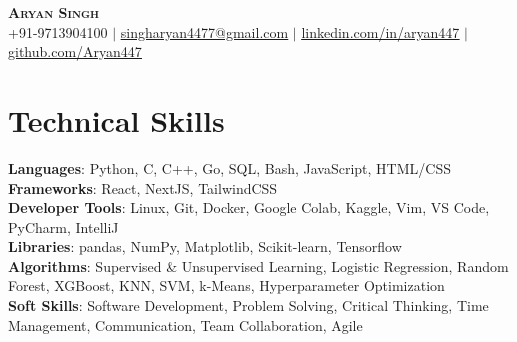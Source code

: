 \documentclass[letterpaper,11pt]{article}
\begin{document}

\begin{center}
    \textbf{\Huge \scshape Aryan Singh} \\ \vspace{1pt}
    \small +91-9713904100 $|$ \href{singharyan4477@gmail.com}{\underline{singharyan4477@gmail.com}} $|$
    \href{https://linkedin.com/in/aryan447/}{\underline{linkedin.com/in/aryan447}} $|$
    \href{https://github.com/Aryan447}{\underline{github.com/Aryan447}}
\end{center}

\section{Technical Skills}
 \begin{itemize}[leftmargin=0.15in, label={}]
    \small{\item{
     \textbf{Languages}{: Python, C, C++, Go, SQL, Bash, JavaScript, HTML/CSS} \\
     \textbf{Frameworks}{: React, NextJS, TailwindCSS} \\
     \textbf{Developer Tools}{: Linux, Git, Docker, Google Colab, Kaggle, Vim, VS Code, PyCharm, IntelliJ} \\
     \textbf{Libraries}{: pandas, NumPy, Matplotlib, Scikit-learn, Tensorflow}
    } \\
    \textbf{Algorithms}{: Supervised \& Unsupervised Learning, Logistic Regression, Random Forest, XGBoost, KNN, SVM, k-Means, Hyperparameter Optimization} \\
    \textbf{Soft Skills}{: Software Development, Problem Solving, Critical Thinking, Time Management, Communication, Team Collaboration, Agile}
  }
 \end{itemize}


\end{document}
